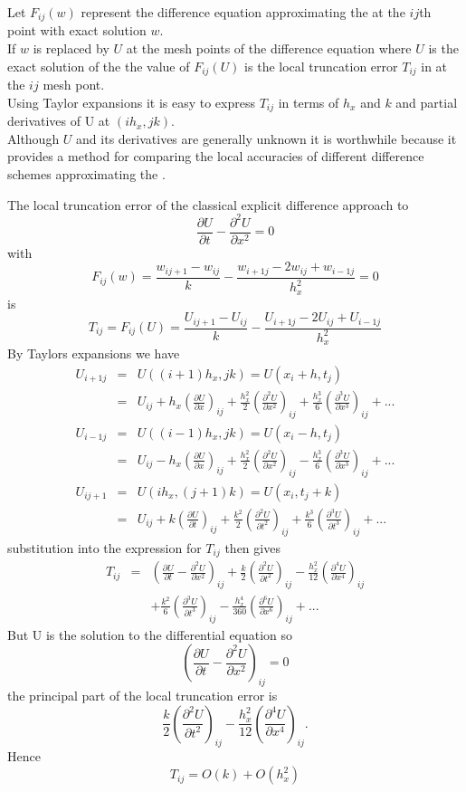 Let $F_{ij}(w)$ represent the difference equation approximating the  at the 
$i j$th point with exact solution $w$.\\
If $w$ is replaced by $U$ at the mesh points of the difference equation where $U$ is the exact solution of the  the value of $F_{ij}(U)$ is the local truncation
error $T_{ij}$ in at the $i j$ mesh pont.\\
Using Taylor expansions it is easy to express $T_{ij}$ in terms of $h_{x}$ and $k$ and partial derivatives of U at $(ih_x,jk)$.\\
Although $U$ and its derivatives are generally unknown it is worthwhile because
it provides a method for comparing the local accuracies of different difference schemes approximating the .
\begin{example}
The local truncation error of the classical explicit difference approach to 
\[ \frac{\partial U}{\partial t} - \frac{\partial^2 U}{\partial x^2}=0\]
with
\[F_{ij}(w)=\frac{w_{ij+1}-w_{ij}}{k}-\frac{w_{i+1j}-2w_{ij}+w_{i-1j}}{h_x^2}=0
\]
is 
\[T_{ij}=F_{ij}(U)=\frac{U_{ij+1}-U_{ij}}{k}-\frac{U_{i+1j}-2U_{ij}+U_{i-1j}}{h_x^2}\]
By Taylors expansions we have
\begin{eqnarray*}
U_{i+1j}&=&U((i+1)h_x,jk)=U(x_i+h,t_j)\\
&=&U_{ij}+h_x\left(\frac{\partial U}{\partial x} \right)_{ij}+\frac{h_x^2}{2}\left(\frac{\partial^2 U}{\partial x^2} \right)_{ij}+\frac{h_x^3}{6}\left(\frac{\partial^3 U}{\partial x^3} \right)_{ij} +...\\
U_{i-1j}&=&U((i-1)h_x,jk)=U(x_i-h,t_j)\\
&=&U_{ij}-h_x\left(\frac{\partial U}{\partial x} \right)_{ij}+\frac{h_x^2}{2}\left(\frac{\partial^2 U}{\partial x^2} \right)_{ij}-\frac{h_x^3}{6}\left(\frac{\partial^3 U}{\partial x^3} \right)_{ij} +...\\
U_{ij+1}&=&U(ih_x,(j+1)k)=U(x_i,t_j+k)\\
&=&U_{ij}+k\left(\frac{\partial U}{\partial t} \right)_{ij}+\frac{k^2}{2}\left(\frac{\partial^2 U}{\partial t^2} \right)_{ij}+\frac{k^3}{6}\left(\frac{\partial^3 U}{\partial t^3} \right)_{ij} +...
\end{eqnarray*}
substitution into the expression for $T_{ij}$ then gives
\begin{eqnarray*}
T_{ij}&=&\left(\frac{\partial U}{\partial t} - \frac{\partial^2 U}{\partial x^2} \right)_{ij}+\frac{k}{2}\left(\frac{\partial^2 U}{\partial t^2} \right)_{ij}
-\frac{h_x^2}{12}\left(\frac{\partial^4 U}{\partial x^4} \right)_{ij}\\
& &	+\frac{k^2}{6}\left(\frac{\partial^3 U}{\partial t^3} \right)_{ij}
-\frac{h_x^4}{360}\left(\frac{\partial^6 U}{\partial x^6} \right)_{ij}+ ...
\end{eqnarray*}
But U is the solution to the differential equation so
\[\left(\frac{\partial U}{\partial t} - \frac{\partial^2 U}{\partial x^2} \right)_{ij}=0 \]
the principal part of the local truncation error is 
\[ \frac{k}{2}\left(\frac{\partial^2 U}{\partial t^2} \right)_{ij}
-\frac{h_x^2}{12}\left(\frac{\partial^4 U}{\partial x^4} \right)_{ij}.\]
Hence
\[T_{ij}=O(k)+O(h_x^2)\]

\end{example}

